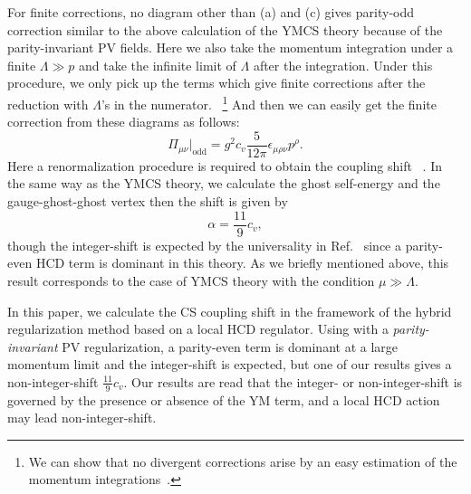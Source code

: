 \documentclass[a4paper,12pt]{article}
\begin{document}
For finite corrections,
no diagram other than (a) and (c) gives parity-odd correction
similar to the above calculation of the YMCS theory
because of the parity-invariant PV fields.
%
Here we also take the momentum integration
under a finite $\Lambda \gg p$
and take the infinite limit of $\Lambda$ after the integration.
%
Under this procedure,
we only pick up the terms which give finite corrections
after the reduction with $\Lambda$'s in the numerator.%
~\footnote{%
 We can show that no divergent corrections arise
 by an easy estimation of the momentum integrations~\cite{Nittoh:2001full}.
 } 
%
And then we can easily get the finite correction from these diagrams
as follows:
%
\begin{equation}
\Pi_{\mu\nu}\big|_\mathrm{odd}=
g^2c_v\frac{5}{12\pi}\epsilon_{\mu\rho\nu}p^\rho.
\end{equation}
%
Here a renormalization procedure is required to obtain the coupling shift%
~\cite{Giavarini:1992xz,Giavarini:1993xb,Chen:1997nv}.
%
In the same way as the YMCS theory,
we calculate the ghost self-energy and the gauge-ghost-ghost vertex
then the shift is given by
%
\begin{equation}
\alpha=\frac{11}{9}c_v,
\end{equation}
%
though the integer-shift is expected
by the universality in Ref.~\cite{Asorey:1994em}
since a parity-even HCD term is dominant in this theory.
%
As we briefly mentioned above,
this result corresponds to the case of YMCS theory
with the condition $\mu \gg \Lambda$.





\label{sec:conclusions and discussions}

In this paper, we calculate the CS coupling shift
in the framework of the hybrid regularization method
based on a local HCD regulator.
%
Using with a \textit{parity-invariant} PV regularization,
a parity-even term is dominant at a large momentum limit
and the integer-shift is expected,
but one of our results gives a non-integer-shift $\frac{11}{9}c_v$.
%
Our results are read that
the integer- or non-integer-shift is governed by
the presence or absence of the YM term,
and a local HCD action may lead non-integer-shift.
%
\end{document}
